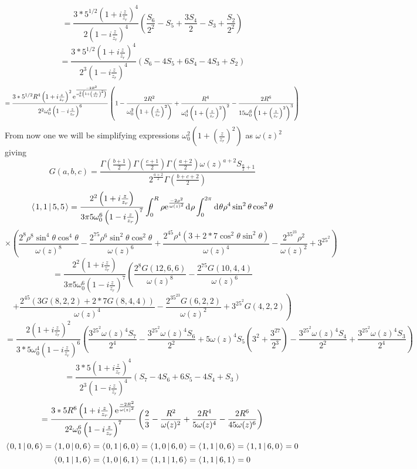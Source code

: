 \documentclass[11pt]{amsart}
\makeatletter
\newcommand{\e}{{\rm e}}				%
\newcommand{\msp}[1]{\mspace{#1mu}}		%
\newcommand{\0}{\varnothing}		%
\newcommand{\dd}{\msp{1} {\rm{d}} \msp{1}}	%
\newcommand{\brac}[2]{\left\langle\msp{2} #1\left\lvert \msp{3.5} #2 \right.\right\rangle}	%
\newcommand{\1}{!}
\newcommand{\2}{@}
\newcommand{\3}{\#}
\newcommand{\4}{\$}
\newcommand{\5}{\%}
\newcommand{\6}{$^\wedge$}
\newcommand{\7}{\&}
\newcommand{\8}{*}
\newcommand{\9}{(}
\makeatother
\begin{document}
\[
=\frac{3*5^{1/2}\left(1+i\frac{z}{z_r}\right)^4}{2\left(1-i\frac{z}{z_r}\right)^4}\left(\frac{S_6}{2^2}-S_5+\frac{3S_4}{2}-S_3+\frac{S_2}{2^2}\right)
\]
\[
=\frac{3*5^{1/2}\left(1+i\frac{z}{z_r}\right)^4}{2^3\left(1-i\frac{z}{z_r}\right)^4}\left(S_6-4S_5+6S_4-4S_3+S_2\right)
\]
\[
=\frac{3*5^{1/2}R^4\left(1+i\frac{z}{z_r}\right)^2\e^{\frac{-2R^2}{\omega_0^2\left(1+\left(\frac{z}{z_r}\right)^2\right)}}}{2^2\omega_0^4\left(1-i\frac{z}{z_r}\right)^6}\left(1-\frac{2R^2}{\omega_0^2\left(1+\left(\frac{z}{z_r}\right)^2\right)}+\frac{R^4}{\omega_0^4\left(1+\left(\frac{z}{z_r}\right)^2\right)^2}-\frac{2R^6}{15\omega_0^6\left(1+\left(\frac{z}{z_r}\right)^2\right)^3}\right)
\]
From now one we will be simplifying expressions $\omega_0^2\left(1+\left(\frac{z}{z_r}\right)^2\right)$ as $\omega(z)^2$ giving 
\[
G(a,b,c) = \frac{\Gamma\left(\frac{b+1}{2}\right)\Gamma\left(\frac{c+1}{2}\right)\Gamma\left(\frac{a+2}{2}\right)\omega(z)^{a+2}S_{\frac{a}{2}+1}}{2^{\frac{a+2}{2}}\Gamma\left(\frac{b+c+2}{2}\right)}
\]
\[
\brac{1,1}{5,5} = \frac{2^2\left(1+i\frac{z}{z_r}\right)}{3\pi5\omega_0^6\left(1-i\frac{z}{z_r}\right)^7}\int_0^R \rho \e^{\frac{-2\rho^2}{\omega(z)^2}}\dd \rho \int_0^{2\pi} \dd \theta \rho^4\sin^2\theta\cos^2\theta
\]
\[
\times\left(\frac{2^8\rho^8\sin^4\theta\cos^4\theta}{\omega(z)^8}-\frac{2^75\rho^6\sin^2\theta\cos^2\theta}{\omega(z)^6}+\frac{2^45\rho^4\left(3+2*7\cos^2\theta\sin^2\theta\right)}{\omega(z)^4}-\frac{2^35^23\rho^2}{\omega(z)^2}+3^25^2\right)
\]
\[
=\frac{2^2\left(1+i\frac{z}{z_r}\right)}{3\pi5\omega_0^6\left(1-i\frac{z}{z_r}\right)^7}\left(\frac{2^8G(12,6,6)}{\omega(z)^8}-\frac{2^75G(10,4,4)}{\omega(z)^6}\right.
\]
\[
\left.+\frac{2^45\left(3G(8,2,2)+2*7G(8,4,4)\right)}{\omega(z)^4}-\frac{2^35^23G(6,2,2)}{\omega(z)^2}+3^25^2G(4,2,2)\right)
\]
\[
=\frac{2\left(1+i\frac{z}{z_r}\right)^2}{3*5\omega_0^4\left(1-i\frac{z}{z_r}\right)^6}\left(\frac{3^25^2\omega(z)^4S_7}{2^4}-\frac{3^25^2\omega(z)^4S_6}{2^2}+5\omega(z)^4S_5\left(3^2+\frac{3^27}{2^3}\right)-\frac{3^25^2\omega(z)^4S_4}{2^2}+\frac{3^25^2\omega(z)^4S_3}{2^4}\right)
\]
\[
=\frac{3*5\left(1+i\frac{z}{z_r}\right)^4}{2^3\left(1-i\frac{z}{z_r}\right)^4}\left(S_7-4S_6+6S_5-4S_4+S_3\right)
\]
\[
=\frac{3*5R^6\left(1+i\frac{z}{z_r}\right)\e^{\frac{-2R^2}{\omega(z)^2}}}{2^2\omega_0^6\left(1-i\frac{z}{z_r}\right)^7}\left(\frac{2}{3}-\frac{R^2}{\omega(z)^2}+\frac{2R^4}{5\omega(z)^4}-\frac{2R^6}{45\omega(z)^6}\right)
\]
\[
\brac{0,1}{0,6} = \brac{1,0}{0,6} = \brac{0,1}{6,0} = \brac{1,0}{6,0} = \brac{1,1}{0,6} = \brac{1,1}{6,0} =0
\]
\[
\brac{0,1}{1,6} = \brac{1,0}{6,1} = \brac{1,1}{1,6}=\brac{1,1}{6,1} = 0
\]
\end{document}
